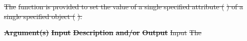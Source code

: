 \documentclass[12pt]{report} %
\providecommand{\DIFdeltex}[1]{{\protect\color{red}\sout{#1}}}                      %
\providecommand{\DIFdelend}{} %
\providecommand{\DIFdel}[1]{\texorpdfstring{\DIFdeltex{#1}}{}} %
\DeclareRobustCommand{\DIFdelend}{\DIFOaddend \let\includegraphics\DIFOincludegraphics} %
\begin{document}
\DIFdel{The }%
\DIFdel{function is provided to set the value of a single specified attribute (}%
\DIFdel{) of a single specified object (}%
\DIFdel{).
}%

\textbf{\DIFdel{Argument(s)}} %
\textbf{\DIFdel{Input }}  %
\textbf{\DIFdel{Description}} %
\textbf{\DIFdel{and/or}}     %
\textbf{\DIFdel{Output}} %
\DIFdel{Input  }%
\DIFdel{The }\DIFdelend %
\end{document}
